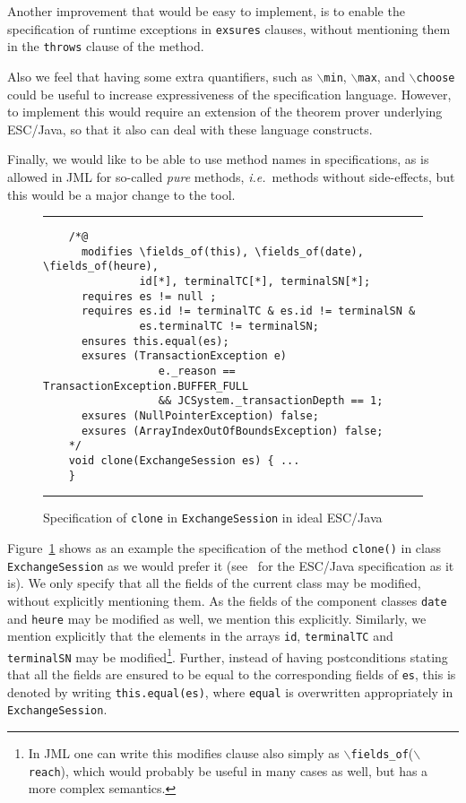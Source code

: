 \documentclass[a4paper]{llncs}
\newcommand{\fieldsof}{\(\backslash\)\texttt{fields\_of}}
\newcommand{\reach}{\(\backslash\)\texttt{reach}}
\begin{document}
Another improvement that would be easy to implement, is to enable the
specification of runtime exceptions in \texttt{exsures} clauses,
without mentioning them in the \texttt{throws} clause of the method.

Also we feel that having some extra quantifiers, such as
\texttt{\(\backslash\)min},
\texttt{\(\backslash\)max}, and \texttt{\(\backslash\)choose} could be 
useful to increase expressiveness of the specification
language. However, to implement this would require an extension of the 
theorem prover underlying ESC/Java, so that it also can deal with
these language constructs.

Finally, we would like to be able to use method
names in specifications, as is allowed in JML for so-called
\emph{pure} methods, \emph{i.e.}~methods without
side-effects, but this would be a major change to the tool.
\begin{figure}[t]
\rule{\linewidth}{0.3mm}
\begin{verbatim}
    /*@
      modifies \fields_of(this), \fields_of(date), \fields_of(heure),
               id[*], terminalTC[*], terminalSN[*];
      requires es != null ;
      requires es.id != terminalTC & es.id != terminalSN &
               es.terminalTC != terminalSN;
      ensures this.equal(es);
      exsures (TransactionException e) 
                  e._reason == TransactionException.BUFFER_FULL 
                  && JCSystem._transactionDepth == 1; 
      exsures (NullPointerException) false;
      exsures (ArrayIndexOutOfBoundsException) false;
    */
    void clone(ExchangeSession es) { ...
    } 
\end{verbatim}
\caption{Specification of \texttt{clone} in \texttt{ExchangeSession}
in ideal ESC/Java}
\label{FigIdealESC}
\rule{\linewidth}{0.3mm}
\end{figure}

Figure~\ref{FigIdealESC} shows as an example the
specification of the method \texttt{clone()} in class
\texttt{ExchangeSession} as we would prefer it (see~\cite{CatanoH01Url} for the
ESC/Java specification as it is). We only specify that all the fields
of the current class may be modified, without explicitly mentioning
them. As the fields of the component classes \texttt{date} and
\texttt{heure} may be modified as well, we mention this
explicitly. Similarly, we mention explicitly that the elements in the
arrays \texttt{id}, \texttt{terminalTC} and \texttt{terminalSN} may be
modified\footnote{In JML one can write this modifies clause also
simply as \fieldsof(\reach), which would probably be useful in many
cases as well, but has a more complex semantics.}. Further, instead of
having postconditions stating that all the fields are ensured to be
equal to the corresponding fields of \texttt{es}, this is denoted by
writing \texttt{this.equal(es)}, where \texttt{equal} is overwritten
appropriately in \texttt{ExchangeSession}.
\end{document}
